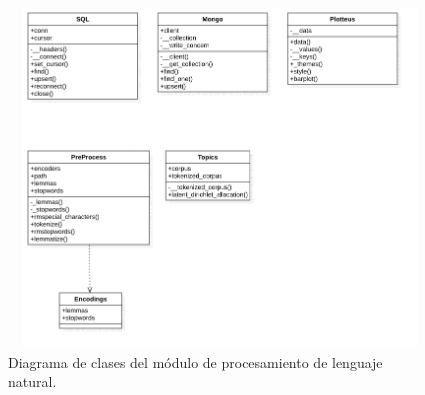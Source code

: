         \begin{figure}[H]
             \centering
             \includegraphics[height=9cm, width=16.5cm]{Latex/Classes/Imagenes/NLP_Classes.png}
             \caption{Diagrama de clases del módulo de procesamiento de lenguaje natural.}
             \label{fig:dc-nlp}
        \end{figure}
